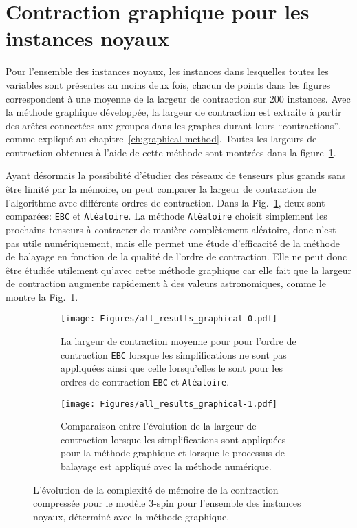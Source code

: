 \section{Contraction graphique pour les instances noyaux}\label{sec:results-only_cores}
Pour l'ensemble des instances noyaux, les instances dans lesquelles toutes les variables sont présentes au moins deux fois, chacun de points dans les figures correspondent à une moyenne de la largeur de contraction sur 200 instances.
Avec la méthode graphique développée, la largeur de contraction est extraite à partir des arêtes connectées aux groupes dans les graphes durant leurs ``contractions'', comme expliqué au chapitre~\ref{ch:graphical-method}.
Toutes les largeurs de contraction obtenues à l'aide de cette méthode sont montrées dans la figure~\ref{subfig:all-results-graphical-a}.

Ayant désormais la possibilité d'étudier des réseaux de tenseurs plus grands sans être limité par la mémoire, on peut comparer la largeur de contraction de l'algorithme avec différents ordres de contraction.
Dans la Fig.~\ref{subfig:all-results-graphical-a}, deux sont comparées: \verb|EBC| et \verb|Aléatoire|.
La méthode \verb|Aléatoire| choisit simplement les prochains tenseurs à contracter de manière complètement aléatoire, donc n'est pas utile numériquement, mais elle permet une étude d'efficacité de la méthode de balayage en fonction de la qualité de l'ordre de contraction.
Elle ne peut donc être étudiée utilement qu'avec cette méthode graphique car elle fait que la largeur de contraction augmente rapidement à des valeurs astronomiques, comme le montre la Fig.~\ref{subfig:all-results-graphical-a}.
\begin{figure}[h]
    \centering
    \begin{subfigure}{.49\textwidth}
        \centering
        \texttt{[image: Figures/all\_results\_graphical-0.pdf]}
        \caption{La largeur de contraction moyenne pour pour l'ordre de contraction \texttt{EBC} lorsque les simplifications ne sont pas appliquées ainsi que celle lorsqu'elles le sont pour les ordres de contraction \texttt{EBC} et \texttt{Aléatoire}.}
        \label{subfig:all-results-graphical-a}
    \end{subfigure}
    \hfill
    \begin{subfigure}{.49\textwidth}
        \centering
        \texttt{[image: Figures/all\_results\_graphical-1.pdf]}
        \caption{Comparaison entre l'évolution de la largeur de contraction lorsque les simplifications sont appliquées pour la méthode graphique et lorsque le processus de balayage est appliqué avec la méthode numérique.}
        \label{subfig:all-results-graphical-b}
    \end{subfigure}
    \caption{L'évolution de la complexité de mémoire de la contraction compressée pour le modèle $3$-spin pour l'ensemble des instances noyaux, déterminé avec la méthode graphique.}
    \label{fig:all-results-graphical}
\end{figure}

